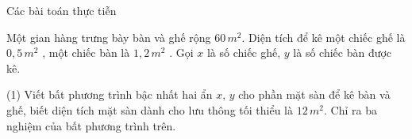 \begin{dang}{Các bài toán thực tiễn}
\end{dang}
\begin{vd}
	Một gian hàng trưng bày bàn và ghế rộng $60\,m^2.$ Diện tích để kê một chiếc ghế là $0,5\,m^2$ , một chiếc bàn là $1,2\,m^2$ . Gọi $x$ là số chiếc ghế, $y$ là số chiếc bàn được kê.
	\begin{tasks}(1)
		\task Viết bất phương trình bậc nhất hai ẩn $x,\,y$ cho phần mặt sàn để kê bàn và ghế, biết diện tích mặt sàn dành cho lưu thông tối thiểu là $12\,m^2.$
		\task Chỉ ra ba nghiệm của bất phương trình trên.
	\end{tasks}
\end{vd} 

